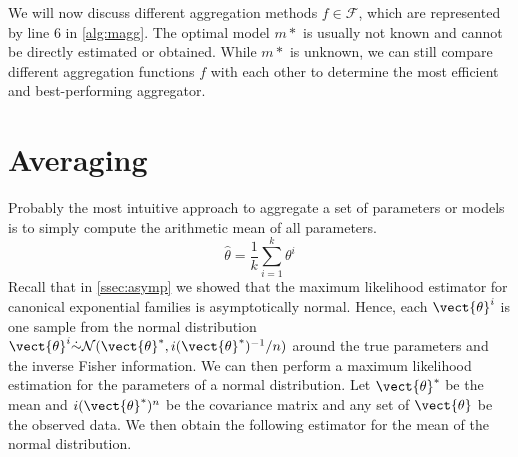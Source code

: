 We will now discuss different aggregation methods $f \in \mathcal{F}$, which are represented by line 6 in \autoref{alg:magg}.
The optimal model $m*$ is usually not known and cannot be directly estimated or obtained.
While  $m*$ is unknown, we can still compare different aggregation functions $f$ with each other to determine the most efficient and best-performing aggregator.


\section{Averaging}

Probably the most intuitive approach to aggregate a set of parameters or models is to simply compute the  arithmetic mean of all parameters.
\begin{equation}
    \label{eq:arithmean}
    \hat{\theta} = \frac{1}{k} \sum_{i=1}^k \theta^i
\end{equation}
Recall that in \autoref{ssec:asymp} we showed that the maximum likelihood estimator for canonical exponential families is asymptotically normal.
Hence, each $\vect{\theta}^i$ is one sample from the normal distribution $\vect{\theta}^i \dot{\sim} \mathcal{N}(\vect{\theta}^*, i(\vect{\theta}^*)^{-1}/n)$ around the true parameters and the inverse Fisher information.
We can then perform a maximum likelihood estimation for the parameters of a normal distribution. 
Let $\vect{\theta}^*$ be the mean and $i(\vect{\theta}^*)^n$ be the covariance matrix and any set of $\vect{\theta}$ be the observed data.
We then obtain the following estimator for the mean of the normal distribution.
